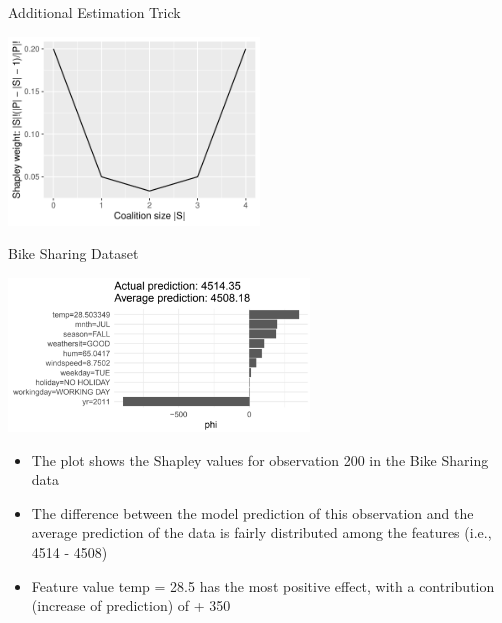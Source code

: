 \documentclass[11pt,compress,t,notes=noshow, aspectratio=169, xcolor=table]{beamer}
\begin{document}
\begin{frame}{Additional Estimation Trick}
      \begin{center}
        \includegraphics[width=0.5\textwidth]{figure/shapley-weights}
      \end{center}
\end{frame}

\begin{frame}{Bike Sharing Dataset}

\begin{center}
\includegraphics[width=0.6\textwidth]{figure_man/bike-sharing03.png}
\end{center}

\begin{itemize}
    \item The plot shows the Shapley values for observation 200 in the Bike Sharing data
    \item The difference between the model prediction of this observation and the average prediction of the data is fairly distributed among the features (i.e., 4514 - 4508)
    \item Feature value temp = 28.5 has the most positive effect, with a contribution (increase of prediction) of + 350
\end{itemize}
\end{frame}


\end{document}
